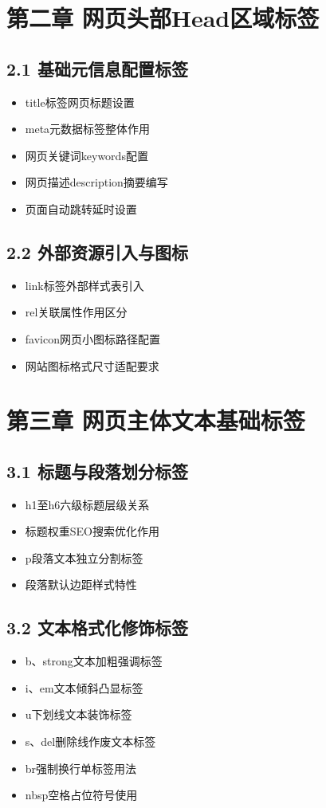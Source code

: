 \section{第二章 网页头部Head区域标签}
\subsection{2.1 基础元信息配置标签}
\begin{itemize}[leftmargin=*]
\item title标签网页标题设置
\item meta元数据标签整体作用
\item 网页关键词keywords配置
\item 网页描述description摘要编写
\item 页面自动跳转延时设置
\end{itemize}

\subsection{2.2 外部资源引入与图标}
\begin{itemize}[leftmargin=*]
\item link标签外部样式表引入
\item rel关联属性作用区分
\item favicon网页小图标路径配置
\item 网站图标格式尺寸适配要求
\end{itemize}

\section{第三章 网页主体文本基础标签}
\subsection{3.1 标题与段落划分标签}
\begin{itemize}[leftmargin=*]
\item h1至h6六级标题层级关系
\item 标题权重SEO搜索优化作用
\item p段落文本独立分割标签
\item 段落默认边距样式特性
\end{itemize}

\subsection{3.2 文本格式化修饰标签}
\begin{itemize}[leftmargin=*]
\item b、strong文本加粗强调标签
\item i、em文本倾斜凸显标签
\item u下划线文本装饰标签
\item s、del删除线作废文本标签
\item br强制换行单标签用法
\item nbsp空格占位符号使用
\end{itemize}

